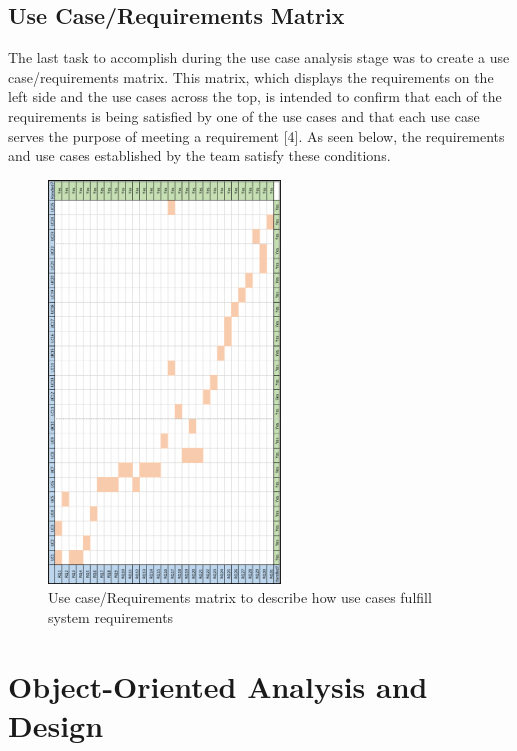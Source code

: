 \documentclass[fontsize=11pt]{extarticle}
\numberwithin{figure}{section} %
\numberwithin{table}{section}%
\begin{document}
\newpage

\hypertarget{use-caserequirements-matrix}{%
\subsection{Use Case/Requirements
Matrix}\label{use-caserequirements-matrix}}

The last task to accomplish during the use case analysis stage was to
create a use case/requirements matrix. This matrix, which displays the
requirements on the left side and the use cases across the top, is
intended to confirm that each of the requirements is being satisfied by
one of the use cases and that each use case serves the purpose of
meeting a requirement {[}4{]}. As seen below, the requirements and use
cases established by the team satisfy these conditions.

\begin{figure}[H]
      \centering
      \includegraphics[trim = 0 0 0 0, clip, width=0.55\textwidth]{TempImg/UCRMatrix.png}
      \caption{Use case/Requirements matrix to describe how use cases fulfill system requirements}
 \end{figure}

\hypertarget{object-oriented-analysis-and-design}{%
\section{Object-Oriented Analysis and
Design}\label{object-oriented-analysis-and-design}}
\end{document}
